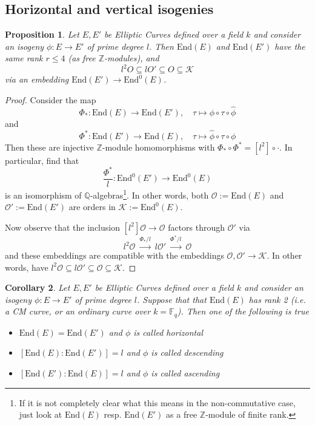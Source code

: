 \documentclass{scrartcl}
\newcommand{\Z}{\mathbb{Z}}
\newcommand{\F}{\mathbb{F}}
\newcommand{\End}{\mathrm{End}}
\renewcommand{\O}{O}
\newcommand{\Order}{\mathcal{O}}
\newtheorem{prop}{Proposition}[section]
\newtheorem{corollary}[prop]{Corollary}
\theoremstyle{definition}
\begin{document}
\subsection{Horizontal and vertical isogenies}

\begin{prop}
    Let $E, E'$ be Elliptic Curves defined over a field $k$ and consider an isogeny $\phi: E \to E'$ of prime degree $l$.
    Then $\End(E)$ and $\End(E')$ have the same rank $r \leq 4$ (as free $\Z$-modules), and
    \begin{equation*}
        l^2\O \subseteq l\O' \subseteq \O \subseteq \mathcal{K}
    \end{equation*}
    via an embedding $\End(E') \to \End^0(E)$.
\end{prop}
\begin{proof}
    Consider the map
    \begin{equation*}
        \Phi_*: \End(E) \to \End(E'), \quad \tau \mapsto \phi \circ \tau \circ \hat{\phi}
    \end{equation*}
    and
    \begin{equation*}
        \Phi^*: \End(E') \to \End(E), \quad \tau \mapsto \hat{\phi} \circ \tau \circ \phi
    \end{equation*}
    Then these are injective $\Z$-module homomorphisms with $\Phi_* \circ \Phi^* = [l^2] \circ \cdot$.
    In particular, find that
    \begin{equation*}
        \frac {\Phi^*} l : \End^0(E') \to \End^0(E)
    \end{equation*}
    is an isomorphism of $\mathbb{Q}$-algebras\footnote{If it is not completely clear what this means in the non-commutative case, just look at $\End(E)$ resp. $\End(E')$ as a free $\Z$-module of finite rank.}.
    In other words, both $\Order := \End(E)$ and $\Order' := \End(E')$ are orders in $\mathcal{K} := \End^0(E)$.

    Now observe that the inclusion $[l^2]\Order \to \Order$ factors through $\Order'$ via
    \begin{equation*}
        l^2 \Order \ \overset{\Phi_* / l}{\to} \ l \Order' \ \overset{\Phi^* / l}{\to} \ \Order
    \end{equation*}
    and these embeddings are compatible with the embeddings $\Order, \Order' \to \mathcal{K}$.
    In other words, have $l^2\Order \subseteq l\Order' \subseteq \Order \subseteq \mathcal{K}$.
\end{proof}
\begin{corollary}
    Let $E, E'$ be Elliptic Curves defined over a field $k$ and consider an isogeny $\phi: E \to E'$ of prime degree $l$.
    Suppose that that $\End(E)$ has rank 2 (i.e. a CM curve, or an ordinary curve over $k = \F_q$).
    Then one of the following is true
    \begin{itemize}
        \item $\End(E) = \End(E')$ and $\phi$ is called \emph{horizontal}
        \item $[\End(E) : \End(E')] = l$ and $\phi$ is called \emph{descending}
        \item $[\End(E') : \End(E)] = l$ and $\phi$ is called \emph{ascending}
    \end{itemize}
\end{corollary}
\end{document}
